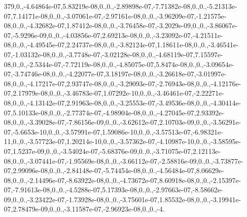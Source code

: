 {379,0.,-\/4.\-64864e-\/07,5.\-83219e-\/08,0.,0.,-\/2.\-89898e-\/07,-\/7.\-71382e-\/08,0.,0.,-\/5.\-21313e-\/07,7.\-14171e-\/08,0.,0.,-\/3.\-07061e-\/07,-\/2.\-97161e-\/08,0.,0.,-\/3.\-96209e-\/07,-\/1.\-21575e-\/08,0.,0.,-\/4.\-32682e-\/07,1.\-87412e-\/08,0.,0.,-\/3.\-76458e-\/07,-\/3.\-2029e-\/09,0.,0.,-\/3.\-86067e-\/07,-\/5.\-9296e-\/09,0.,0.,-\/4.\-03856e-\/07,2.\-69213e-\/08,0.,0.,-\/3.\-23092e-\/07,-\/4.\-21511e-\/08,0.,0.,-\/4.\-49545e-\/07,2.\-24737e-\/08,0.,0.,-\/3.\-82124e-\/07,1.\-18611e-\/08,0.,0.,-\/3.\-46541e-\/07,-\/1.\-03132e-\/08,0.,0.,-\/3.\-7748e-\/07,-\/3.\-02128e-\/08,0.,0.,-\/4.\-68119e-\/07,7.\-15597e-\/08,0.,0.,-\/2.\-5344e-\/07,-\/7.\-72119e-\/08,0.,0.,-\/4.\-85075e-\/07,5.\-8474e-\/08,0.,0.,-\/3.\-09654e-\/07,-\/3.\-74746e-\/08,0.,0.,-\/4.\-22077e-\/07,3.\-18197e-\/08,0.,0.,-\/3.\-26618e-\/07,-\/3.\-01997e-\/08,0.,0.,-\/4.\-17217e-\/07,2.\-93747e-\/08,0.,0.,-\/3.\-29093e-\/07,-\/2.\-76943e-\/08,0.,0.,-\/4.\-12176e-\/07,2.\-17979e-\/08,0.,0.,-\/3.\-46783e-\/07,1.\-07292e-\/10,0.,0.,-\/3.\-46461e-\/07,-\/2.\-22271e-\/08,0.,0.,-\/4.\-13142e-\/07,2.\-91963e-\/08,0.,0.,-\/3.\-25553e-\/07,-\/3.\-49536e-\/08,0.,0.,-\/4.\-30414e-\/07,5.\-10133e-\/08,0.,0.,-\/2.\-77374e-\/07,-\/4.\-98904e-\/08,0.,0.,-\/4.\-27045e-\/07,2.\-93392e-\/08,0.,0.,-\/3.\-39028e-\/07,-\/7.\-86156e-\/09,0.,0.,-\/3.\-62612e-\/07,2.\-10703e-\/09,0.,0.,-\/3.\-56291e-\/07,-\/5.\-6653e-\/10,0.,0.,-\/3.\-57991e-\/07,1.\-59086e-\/10,0.,0.,-\/3.\-57513e-\/07,-\/6.\-98321e-\/11,0.,0.,-\/3.\-57723e-\/07,1.\-20214e-\/10,0.,0.,-\/3.\-57362e-\/07,-\/4.\-10987e-\/10,0.,0.,-\/3.\-58595e-\/07,1.\-5237e-\/09,0.,0.,-\/3.\-54024e-\/07,-\/5.\-68376e-\/09,0.,0.,-\/3.\-71075e-\/07,2.\-12113e-\/08,0.,0.,-\/3.\-07441e-\/07,-\/1.\-95569e-\/08,0.,0.,-\/3.\-66112e-\/07,-\/2.\-58816e-\/09,0.,0.,-\/3.\-73877e-\/07,2.\-99096e-\/08,0.,0.,-\/2.\-84148e-\/07,-\/5.\-74454e-\/08,0.,0.,-\/4.\-56484e-\/07,8.\-06629e-\/08,0.,0.,-\/2.\-14496e-\/07,-\/8.\-63922e-\/08,0.,0.,-\/4.\-73672e-\/07,8.\-60918e-\/08,0.,0.,-\/2.\-15397e-\/07,-\/7.\-91613e-\/08,0.,0.,-\/4.\-5288e-\/07,5.\-17393e-\/08,0.,0.,-\/2.\-97663e-\/07,-\/8.\-58662e-\/09,0.,0.,-\/3.\-23422e-\/07,-\/1.\-73928e-\/08,0.,0.,-\/3.\-75601e-\/07,1.\-85532e-\/08,0.,0.,-\/3.\-19941e-\/07,2.\-78479e-\/09,0.,0.,-\/3.\-11587e-\/07,-\/2.\-96923e-\/08,0.,0.,-\/4.\-}
